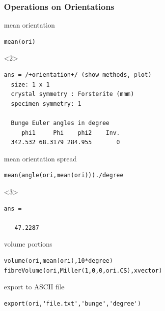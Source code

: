 \documentclass[compress]{beamer}
\begin{document}
\begin{frame}[fragile]
  \frametitle{Operations on Orientations}




mean orientation
  \begin{lstlisting}[style=input]
mean(ori)
  \end{lstlisting}

  \begin{onlyenv}<2>
    \begin{lstlisting}[style=output]
ans = /+orientation+/ (show methods, plot)
  size: 1 x 1
  crystal symmetry : Forsterite (mmm)
  specimen symmetry: 1

  Bunge Euler angles in degree
     phi1     Phi    phi2    Inv.
  342.532 68.3179 284.955       0
    \end{lstlisting}
  \end{onlyenv}

\pause
\medskip

  mean orientation spread
  \begin{lstlisting}[style=input]
mean(angle(ori,mean(ori)))./degree
  \end{lstlisting}

  \begin{onlyenv}<3>
    \begin{lstlisting}[style=output]
ans =

   47.2287
\end{lstlisting}
  \end{onlyenv}

\pause
\medskip

volume portions
\begin{lstlisting}[style=input]
volume(ori,mean(ori),10*degree)
fibreVolume(ori,Miller(1,0,0,ori.CS),xvector)
\end{lstlisting}

\pause
\medskip

export to ASCII file
\begin{lstlisting}[style=input]
export(ori,'file.txt','bunge','degree')
\end{lstlisting}

\end{frame}
\end{document}
